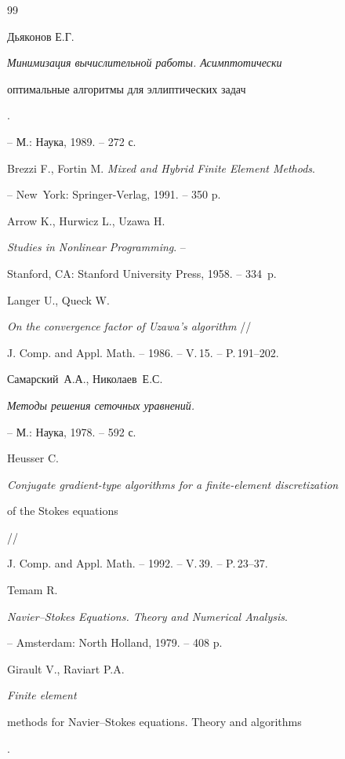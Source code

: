 \begin{thebibliography}{99}







Дьяконов Е.Г. {\em Минимизация вычислительной работы. Асимптотически 


оптимальные алгоритмы для эллиптических задач}.


-- М.: Наука, 1989. -- 272 с.




Brezzi F., Fortin M. {\em Mixed and Hybrid Finite Element Methods}.


-- New~York: Springer-Verlag, 1991. -- 350 p.




Arrow K., Hurwicz L., Uzawa H.


{\em Studies in Nonlinear Programming}. --


Stanford, CA: Stanford University Press, 1958. -- 334~p.




Langer U., Queck W.


{\em On the convergence factor of Uzawa's algorithm} //


J. Comp. and Appl. Math. -- 1986. -- V.\,15. -- P.\,191--202.




Самарский~А.А., Николаев~Е.С.


{\em Методы решения сеточных уравнений.}


-- М.: Наука, 1978. -- 592 с.




Heusser C.


{\em Conjugate gradient-type algorithms for a finite-element discretization


of the Stokes equations} //


J. Comp. and Appl. Math. -- 1992. -- V.\,39. -- P.\,23--37.




Temam R.


{\em Navier--Stokes Equations. Theory and Numerical Analysis}.


-- Amsterdam: North Holland, 1979. -- 408 p.




Girault V., Raviart P.A.


{\em Finite element


methods for Navier--Stokes equations. Theory and algorithms}.



\end{thebibliography}
